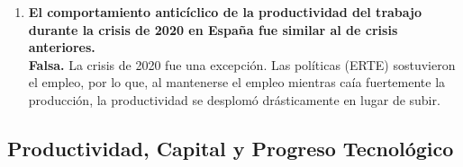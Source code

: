 \begin{enumerate}[label=\arabic*., resume=preguntas]
    \item \textbf{El comportamiento anticíclico de la productividad del trabajo durante la crisis de 2020 en España fue similar al de crisis anteriores.} \\
    \textbf{Falsa.} La crisis de 2020 fue una excepción. Las políticas (ERTE) sostuvieron el empleo, por lo que, al mantenerse el empleo mientras caía fuertemente la producción, la productividad se desplomó drásticamente en lugar de subir.

\end{enumerate}

\subsection*{Productividad, Capital y Progreso Tecnológico}

